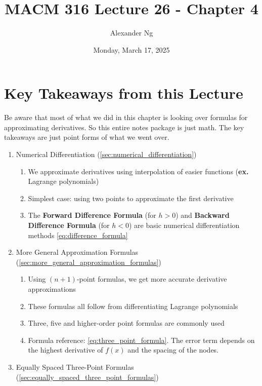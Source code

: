 \documentclass[12pt]{article}
\newcommand{\ex}{\textbf{ex.}\xspace}
\begin{document}
\title{MACM 316 Lecture 26 - Chapter 4}
\author{Alexander Ng}
\date{Monday, March 17, 2025}

\maketitle

\section*{Key Takeaways from this Lecture}

Be aware that most of what we did in this chapter is looking over formulas for
approximating derivatives. So this entire notes package is just math. The key
takeaways are just point forms of what we went over.

\begin{enumerate}
  \item Numerical Differentiation (\ref{sec:numerical_differentiation})
    \begin{enumerate}[label=(\alph*)]
      \item We approximate derivatives using interpolation of easier functions 
        (\ex Lagrange polynomials)
      \item Simplest case: using two points to approximate the first derivative
      \item The \textbf{Forward Difference Formula} (for $h>0$) and
        \textbf{Backward Difference Formula} (for $h<0$) are basic numerical
        differentiation methods \eqref{eq:difference_formula}
    \end{enumerate}
  \item More General Approximation Formulas (\ref{sec:more_general_approximation_formulas})
    \begin{enumerate}[label=(\alph*)]
      \item Using $(n+1)$-point formulas, we get more accurate derivative
        approximations
      \item These formulas all follow from differentiating Lagrange polynomials
      \item Three, five and higher-order point formulas are commonly used
      \item Formula reference: \eqref{eq:three_point_formula}. The error term
        depends on the highest derivative of $f(x)$ and the spacing of the
        nodes.
    \end{enumerate}
  \item Equally Spaced Three-Point Formulas (\ref{sec:equally_spaced_three_point_formulas})

\end{enumerate}
\end{document}
